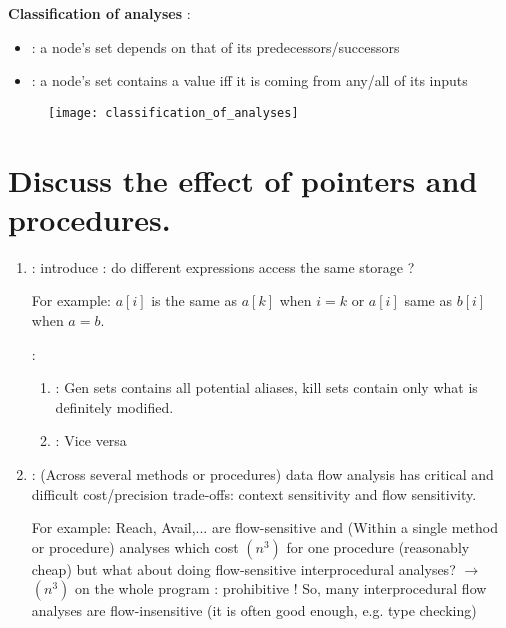 \textbf{Classification of analyses} :
\begin{itemize}
    \item {} : a node’s set depends on that of its predecessors/successors
    \item {} : a node’s set contains a value iff it is coming from any/all of its inputs
\end{itemize}

\begin{figure}[H]
    \centering
    \texttt{[image: classification\_of\_analyses]}
\end{figure}

\section{Discuss the effect of pointers and procedures.}

\begin{enumerate}
    \item {} : introduce  : do different expressions access the same storage ?
    
    For example: $a[i]$ is the same as $a[k]$ when $i=k$ or $a[i]$ same as $b[i]$ when $a=b$. 
    
    : 
    \begin{enumerate}
        \item {} : Gen sets contains all potential aliases, kill sets contain only what is definitely modified.
        \item {} : Vice versa
    \end{enumerate}
    \item {} :  (Across several methods or procedures) data flow analysis has critical and difficult cost/precision trade-offs: context sensitivity and flow sensitivity.
    
    For example: Reach, Avail,... are flow-sensitive and  (Within a single method or procedure) analyses which cost \bigO$(n^3)$ for one procedure (reasonably cheap) but what about doing flow-sensitive interprocedural analyses? $\rightarrow$ \bigO$(n^3)$ on the whole program : prohibitive ! So, many interprocedural flow analyses are flow-insensitive (it is often good enough, e.g. type checking)
\end{enumerate}

